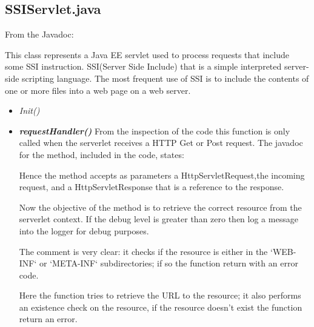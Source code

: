 \documentclass[11pt,titlepage]{article} %
\begin{document}
\subsection{SSIServlet.java}

  From the Javadoc:
  
  

  \noindent This class represents a Java EE servlet used to process requests that include some SSI instruction.\newline
  SSI(Server Side Include) that is a simple interpreted server-side scripting language.
  The most frequent use of SSI is to include the contents of one or more files into a web page on a web server.

  \begin{itemize}
    \item \textit{Init()}
    \item \textbf{\textit{requestHandler()}}
      \newline From the inspection of the code this function is only called when the serverlet receives a HTTP Get or Post request.
      The javadoc for the method, included in the code, states:
      
      
      
      Hence the method accepts as parameters a HttpServletRequest,the incoming request, and a HttpServletResponse that is a reference
      to the response.\newline
      
      Now the objective of the method is to retrieve the correct resource from the serverlet context.
      If the debug level is greater than zero then log a message into the logger for debug purposes.
      

      The comment is very clear: it checks if the resource is either in the `WEB-INF` or `META-INF` subdirectories;
      if so the function return with an error code.
      
      
      Here the function tries to retrieve the URL to the resource; it also performs an existence check on the resource,
      if the resource doesn't exist the function return an error.
      
      

\end{itemize}
\end{document}
